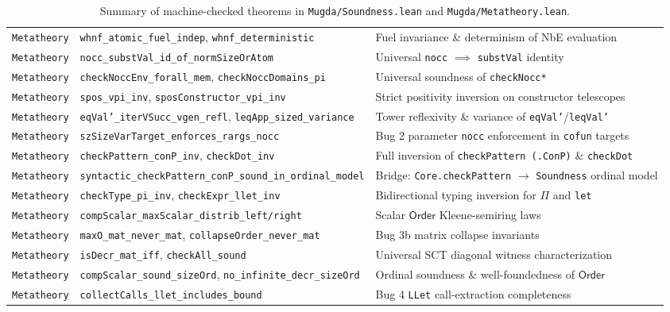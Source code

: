 \documentclass[11pt,a4paper]{article}
\begin{document}
\begin{table}[ht]
\begin{tabular}{@{}lll@{}}
\texttt{Metatheory} & \texttt{whnf\_atomic\_fuel\_indep}, \texttt{whnf\_deterministic} & Fuel invariance \& determinism of NbE evaluation \\
\texttt{Metatheory} & \texttt{nocc\_substVal\_id\_of\_normSizeOrAtom} & Universal \texttt{nocc} $\implies$ \texttt{substVal} identity \\
\texttt{Metatheory} & \texttt{checkNoccEnv\_forall\_mem}, \texttt{checkNoccDomains\_pi} & Universal soundness of \texttt{checkNocc*} \\
\texttt{Metatheory} & \texttt{spos\_vpi\_inv}, \texttt{sposConstructor\_vpi\_inv} & Strict positivity inversion on constructor telescopes \\
\texttt{Metatheory} & \texttt{eqVal'\_iterVSucc\_vgen\_refl}, \texttt{leqApp\_sized\_variance} & Tower reflexivity \& variance of \texttt{eqVal'}/\texttt{leqVal'} \\
\texttt{Metatheory} & \texttt{szSizeVarTarget\_enforces\_rargs\_nocc} & Bug 2 parameter \texttt{nocc} enforcement in \texttt{cofun} targets \\
\texttt{Metatheory} & \texttt{checkPattern\_conP\_inv}, \texttt{checkDot\_inv} & Full inversion of \texttt{checkPattern (.ConP)} \& \texttt{checkDot} \\
\texttt{Metatheory} & \texttt{syntactic\_checkPattern\_conP\_sound\_in\_ordinal\_model} & Bridge: \texttt{Core.checkPattern} $\to$ \texttt{Soundness} ordinal model \\
\texttt{Metatheory} & \texttt{checkType\_pi\_inv}, \texttt{checkExpr\_llet\_inv} & Bidirectional typing inversion for $\Pi$ and \texttt{let} \\
\texttt{Metatheory} & \texttt{compScalar\_maxScalar\_distrib\_left/right} & Scalar $\mathsf{Order}$ Kleene-semiring laws \\
\texttt{Metatheory} & \texttt{maxO\_mat\_never\_mat}, \texttt{collapseOrder\_never\_mat} & Bug 3b matrix collapse invariants \\
\texttt{Metatheory} & \texttt{isDecr\_mat\_iff}, \texttt{checkAll\_sound} & Universal SCT diagonal witness characterization \\
\texttt{Metatheory} & \texttt{compScalar\_sound\_sizeOrd}, \texttt{no\_infinite\_decr\_sizeOrd} & Ordinal soundness \& well-foundedness of $\mathsf{Order}$ \\
\texttt{Metatheory} & \texttt{collectCalls\_llet\_includes\_bound} & Bug 4 \texttt{LLet} call-extraction completeness \\
\bottomrule
\end{tabular}
\caption{Summary of machine-checked theorems in \texttt{Mugda/Soundness.lean} and \texttt{Mugda/Metatheory.lean}.}
\label{tab:theorems}
\end{table}
\end{document}
